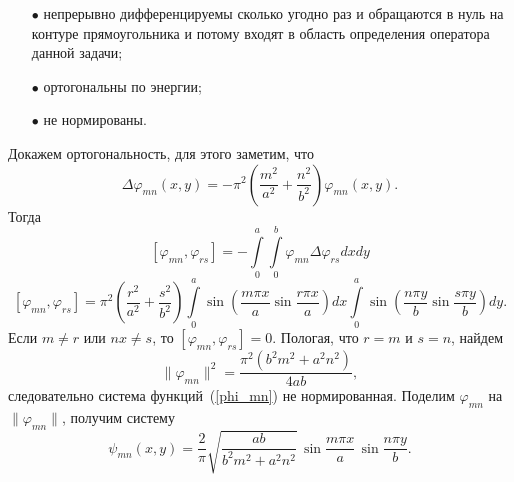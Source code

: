 \documentclass[12pt, a4paper]{article}
\begin{document}
\begin{itemize}
	\item [$\bullet$] непрерывно дифференцируемы сколько угодно раз и
	обращаются в нуль на контуре прямоугольника и потому входят в
	область определения оператора данной задачи;
	\item [$\bullet$] ортогональны по энергии;
	\item [$\bullet$] не нормированы.
\end{itemize}
Докажем ортогональность, для этого заметим, что
\begin{equation}
	\Delta \varphi_{mn}(x, y) = - \pi^2 \left(\frac{m^2}{a^2} + \frac{n^2}{b^2}\right)\varphi_{mn}(x, y).
\end{equation}
Тогда 
\[
	[\varphi_{mn}, \varphi_{rs}] = - \int\limits_0^a \int\limits_0^b \varphi_{mn} \Delta \varphi_{rs} dx dy
\]
\[
  	[\varphi_{mn}, \varphi_{rs}] = \pi^2(\frac{r^2}{a^2} + \frac{s^2}{b^2})
  	\int\limits_0^a \sin \left(\frac{m \pi x}{a} \sin \frac{r \pi x}{a}\right) dx
  	\int\limits_0^a \sin \left(\frac{n \pi y}{b} \sin \frac{s \pi y}{b}\right) dy.
\]
Если $m \neq r$ или $nx \neq s$, то $[\varphi_{mn}, \varphi_{rs}] = 0$. Пологая, что $r = m$ и $s = n$, найдем 
\[
	\| \varphi_{mn} \|^2 = \frac{\pi^2\left(b^2 m^2 + a^2 n^2\right)}{4ab},
\]
следовательно система функций~(\ref{phi_mn}) не нормированная.
Поделим $\varphi_{mn}$ на $\| \varphi_{mn} \|$, получим систему
\begin{equation}  \label{norm_psi_mn}
	\psi_{mn}(x, y) = \frac{2}{\pi} \sqrt{\frac{ab}{b^2 m^2 + a^2 n^2}} \, \sin\frac{m\pi x}{a} \, \sin\frac{n\pi y}{b}.
\end{equation}
\end{document}
